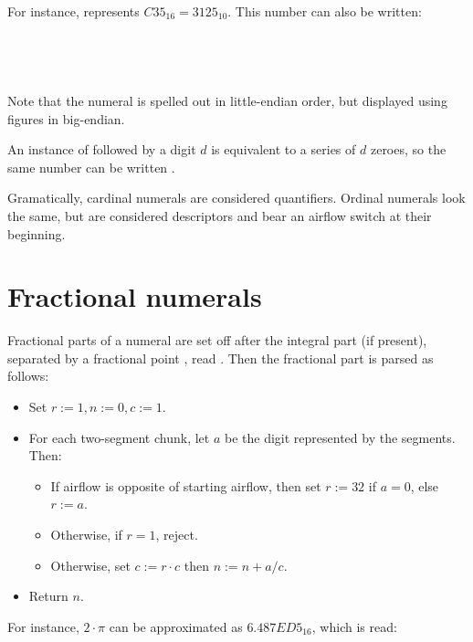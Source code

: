 \documentclass{book}
\begin{document}
For instance,  represents $C35_{16} = 3125_{10}$. This number can also be written: \\
~\\
 \\
 \\
 \\

Note that the numeral is spelled out in little-endian order, but displayed using figures in big-endian.

An instance of  followed by a digit $d$ is equivalent to a series of $d$ zeroes, so the same number can be written .

Gramatically, cardinal numerals are considered quantifiers. Ordinal numerals look the same, but are considered descriptors and bear an airflow switch at their beginning.

\section{Fractional numerals}

Fractional parts of a numeral are set off after the integral part (if present), separated by a fractional point \hortho{\textvariko{,}}, read . Then the fractional part is parsed as follows:

\begin{itemize}
  \item Set $r := 1, n := 0, c := 1$.
  \item For each two-segment chunk, let $a$ be the digit represented by the segments. Then:
  \begin{itemize}
    \item If airflow is opposite of starting airflow, then set $r := 32$ if $a = 0$, else $r := a$.
    \item Otherwise, if $r = 1$, reject.
    \item Otherwise, set $c := r \cdot c$ then $n := n + a / c$.
  \end{itemize}
  \item Return $n$.
\end{itemize}

For instance, $2 \cdot \pi$ can be approximated as $6.487ED5_{16}$, which is read: \\
~\\
 \\
 \\
 \\
\end{document}
